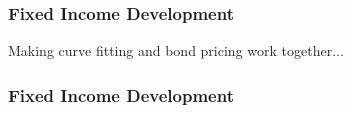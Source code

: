\documentclass[compress]{beamer}
\begin{document}
\begin{frame}
	\frametitle{Fixed Income Development}
	Making curve fitting and bond pricing work together...
	\begin{center}
	\end{center}
\end{frame}
\begin{frame}
	\frametitle{Fixed Income Development}

	\begin{center}
	\end{center}
\end{frame}
\end{document}

